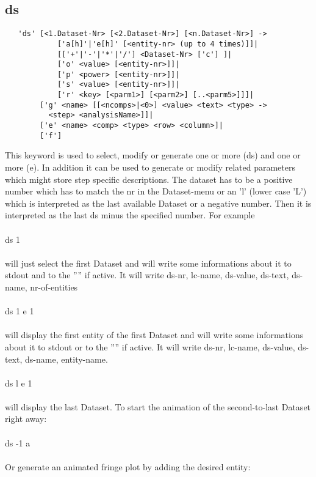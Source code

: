\documentclass{article}
\begin{document}
\subsection{\label{ds}ds}
\begin{verbatim}
   'ds' [<1.Dataset-Nr> [<2.Dataset-Nr>] [<n.Dataset-Nr>] ->
            ['a[h]'|'e[h]' [<entity-nr> (up to 4 times)]]|
            [['+'|'-'|'*'|'/'] <Dataset-Nr> ['c'] ]|
            ['o' <value> [<entity-nr>]]|
            ['p' <power> [<entity-nr>]]|
            ['s' <value> [<entity-nr>]]|
            ['r' <key> [<parm1>] [<parm2>] [..<parm5>]]]|
        ['g' <name> [[<ncomps>|<0>] <value> <text> <type> ->
          <step> <analysisName>]]|
        ['e' <name> <comp> <type> <row> <column>]|
        ['f']
\end{verbatim}
This keyword is used to select, modify or generate one or more  (ds) and one or more  (e). In addition it can be used to generate or modify related parameters which might store step specific descriptions. The dataset has to be a positive number which has to match the nr in the Dataset-menu or an 'l' (lower case 'L') which is interpreted as the last available Dataset or a negative number. Then it is interpreted as the last ds minus the specified number. For example\\\\
ds 1\\\\
will just select the first Dataset and will write some informations about it to stdout and to the '''' if active. It will write ds-nr, lc-name, ds-value, ds-text, ds-name, nr-of-entities \\\\
ds 1 e 1\\\\
will display the first entity of the first Dataset and will write some informations about it to stdout or to the '''' if active. It will write ds-nr, lc-name, ds-value, ds-text, ds-name, entity-name.\\\\
ds l e 1\\\\
will display the last Dataset.
To start the animation of the second-to-last Dataset right away:\\\\
ds -1 a\\\\
Or generate an animated fringe plot by adding the desired entity:\\\\
\end{document}
